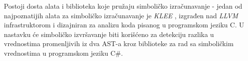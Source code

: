 Postoji dosta alata i biblioteka koje pružaju simboličko izračunavanje - jedan od najpoznatijih alata za simboličko izračunavanje je \emph{KLEE} \cite{KLEE}, izgrađen nad \emph{LLVM} infrastruktorom \cite{LLVM} i dizajniran za analizu koda pisanog u programskom jeziku C. U nastavku će simboličko izvršavanje biti korišćeno za detekciju razlika u vrednostima promenljivih iz dva AST-a kroz biblioteke za rad sa simboličkim vrednostima u programskom jeziku C\#.
